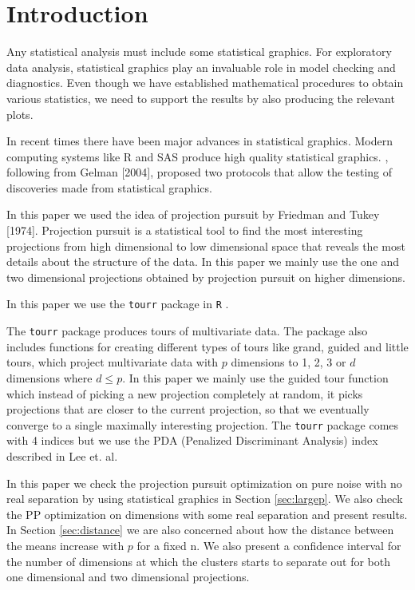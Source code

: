 \documentclass[12]{report}
\begin{document}
\section{Introduction} 

Any statistical analysis must include some statistical graphics. For exploratory data analysis, statistical graphics play an invaluable role in model checking and diagnostics. Even though we have established mathematical procedures to obtain various statistics, we need to support the results by also producing the relevant plots. 

In recent times there have been major advances in statistical graphics. Modern computing systems like R and SAS produce high quality statistical graphics. \cite{buja:2009}, following from Gelman [2004], proposed two protocols that allow the testing of discoveries made from statistical graphics. 

In this paper we used the idea of projection pursuit by Friedman and Tukey [1974]. Projection pursuit is a statistical tool to find the most interesting projections from high dimensional to low dimensional space that reveals the most details about the structure of the data. In this paper we mainly use the one and two dimensional projections obtained by projection pursuit on higher dimensions.

In this paper we use the \texttt{tourr} package in \texttt{R} \cite{r} . %

The \texttt{tourr} package produces tours of multivariate data. The package also includes functions for creating different types of tours like grand, guided and little tours, which project multivariate data with $p$ dimensions to 1, 2, 3 or $d$ dimensions where $d \le p$. In this paper we mainly use the guided tour function which instead of picking a new projection completely at random, it picks projections that are closer to the current projection, so that we eventually converge to a single maximally interesting projection. The \texttt{tourr} package comes with 4 indices but we use the PDA (Penalized Discriminant Analysis)  index described in Lee et. al.      

In this paper we check the projection pursuit optimization on pure noise with no real separation by using statistical graphics in Section \ref{sec:largep}. We also check the PP optimization on dimensions with some real separation and present results. In Section  \ref{sec:distance} we are also concerned about how the distance between the means increase with $p$ for a fixed n. We also present a confidence interval for the number of dimensions at which the clusters starts to separate out for both one dimensional and two dimensional projections.
\end{document}
